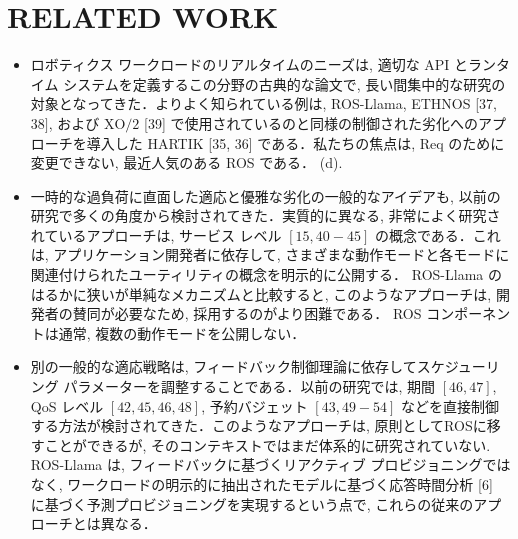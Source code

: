 
\section{RELATED WORK}
\label{sec: related work}

\begin{frame}{}
    \begin{itemize}
        \item ロボティクス ワークロードのリアルタイムのニーズは, 適切な API とランタイム システムを定義するこの分野の古典的な論文で, 長い間集中的な研究の対象となってきた．よりよく知られている例は, ROS-Llama, ETHNOS [37, $38]$, および $\mathrm{XO} / 2$ [39] で使用されているのと同様の制御された劣化へのアプローチを導入した HARTIK [35, 36] である．私たちの焦点は, Req のために変更できない, 最近人気のある ROS である． (d).
    \end{itemize}
\end{frame}

\begin{frame}{}
    \begin{itemize}
        \item  一時的な過負荷に直面した適応と優雅な劣化の一般的なアイデアも, 以前の研究で多くの角度から検討されてきた．実質的に異なる, 非常によく研究されているアプローチは, サービス レベル $[15,40-45]$ の概念である．これは, アプリケーション開発者に依存して, さまざまな動作モードと各モードに関連付けられたユーティリティの概念を明示的に公開する． ROS-Llama のはるかに狭いが単純なメカニズムと比較すると, このようなアプローチは, 開発者の賛同が必要なため, 採用するのがより困難である． ROS コンポーネントは通常, 複数の動作モードを公開しない．
    \end{itemize}
\end{frame}

\begin{frame}{}
    \begin{itemize}
        \item 別の一般的な適応戦略は, フィードバック制御理論に依存してスケジューリング パラメーターを調整することである．以前の研究では, 期間 $[46,47]$, QoS レベル $[42,45,46,48]$, 予約バジェット $[43,49-54]$ などを直接制御する方法が検討されてきた．このようなアプローチは, 原則としてROSに移すことができるが, そのコンテキストではまだ体系的に研究されていない. ROS-Llama は, フィードバックに基づくリアクティブ プロビジョニングではなく, ワークロードの明示的に抽出されたモデルに基づく応答時間分析 [6] に基づく予測プロビジョニングを実現するという点で, これらの従来のアプローチとは異なる．
    \end{itemize}
\end{frame}

